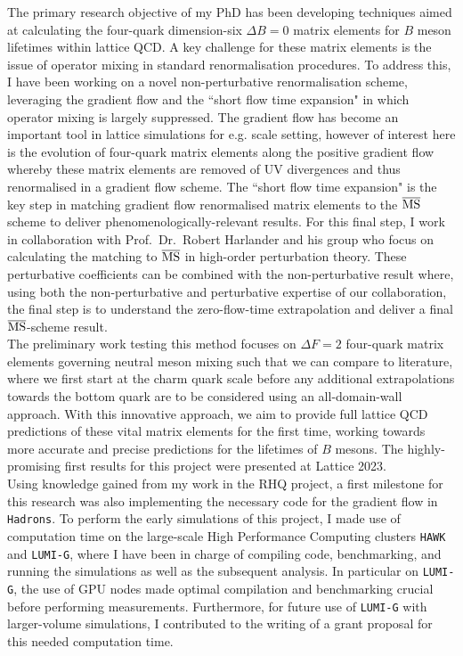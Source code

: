 \documentclass[11pt, a4paper]{awesome-cv}
\begin{document}
\begin{cvletter}
The primary research objective of my PhD has been developing techniques aimed at calculating the four-quark dimension-six $\Delta B=0$ matrix elements for $B$ meson lifetimes within lattice QCD. 
A key challenge for these matrix elements is the issue of operator mixing in standard renormalisation procedures. 
To address this, I have been working on a novel non-perturbative renormalisation scheme, leveraging the gradient flow and the ``short flow time expansion" in which operator mixing is largely suppressed. 
The gradient flow has become an important tool in lattice simulations for e.g. scale setting, however of interest here is the evolution of four-quark matrix elements along the positive gradient flow whereby these matrix elements are removed of UV divergences and thus renormalised in a gradient flow scheme.
The ``short flow time expansion" is the key step in matching gradient flow renormalised matrix elements to the $\overline{\rm MS}$ scheme to deliver phenomenologically-relevant results. 
For this final step, I work in collaboration with Prof.~Dr.~Robert Harlander and his group who focus on calculating the matching to $\overline{\rm MS}$ in high-order perturbation theory.
These perturbative coefficients can be combined with the non-perturbative result where, using both the non-perturbative and perturbative expertise of our collaboration, the final step is to understand the zero-flow-time extrapolation and deliver a final $\overline{\rm MS}$-scheme result.\\
The preliminary work testing this method focuses on $\Delta F=2$ four-quark matrix elements governing neutral meson mixing such that we can compare to literature, where we first start at the charm quark scale before any additional extrapolations towards the bottom quark are to be considered using an all-domain-wall approach.
With this innovative approach, we aim to provide full lattice QCD predictions of these vital matrix elements for the first time, working towards more accurate and precise predictions for the lifetimes of $B$ mesons.
The highly-promising first results for this project were presented at Lattice 2023.\\
Using knowledge gained from my work in the RHQ project, a first milestone for this research was also implementing the necessary code for the gradient flow in {\tt Hadrons}.
To perform the early simulations of this project, I made use of computation time on the large-scale High Performance Computing clusters {\tt HAWK} and {\tt LUMI-G}, where I have been in charge of compiling code, benchmarking, and running the simulations as well as the subsequent analysis. 
In particular on {\tt LUMI-G}, the use of GPU nodes made optimal compilation and benchmarking crucial before performing measurements.
Furthermore, for future use of {\tt LUMI-G} with larger-volume simulations, I contributed to the writing of a grant proposal for this needed computation time.


\end{cvletter}
\end{document}
